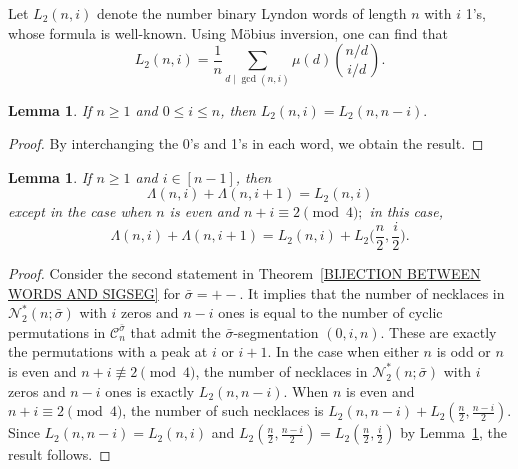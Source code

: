 \documentclass[12pt]{article}
\newcommand{\C}{\mathcal{C}}
\newcommand{\N}{\mathcal{N}}
\theoremstyle{plain}
\newtheorem{lemma}[theorem]{Lemma}
\theoremstyle{definition}
\begin{document}
Let $L_2(n,i)$ denote the number binary Lyndon words of length $n$ with $i$ 1's,  whose formula is well-known. Using M\"obius inversion, one can find that $$L_2(n,i) = \frac{1}{n} \sum_{d\mid\gcd(n,i)} \mu(d) {{n/d}\choose{i/d}}.$$

 
 
\begin{lemma}\label{WORD SYMMETRY}
If $n\geq 1$ and $0\leq i \leq n$, then $L_2(n,i)=L_2(n,n-i).$
\end{lemma}

\begin{proof}
By interchanging the 0's and 1's in each word, we obtain the result.
\end{proof}


\begin{lemma}\label{SUM PEAKS}
If $n\geq 1$ and $i \in [n-1]$, then
	\[\Lambda(n,i)+\Lambda(n,i+1)= L_2(n,i) \]
except in the case when $n$ is even and $n+i \equiv 2 \!\pmod 4;$ in this case,
	  \[\Lambda(n,i)+\Lambda(n,i+1)= L_2(n,i)+L_2\Big(\frac n2,\frac i2\Big). \]
\end{lemma}
	

\begin{proof}
Consider the second statement in Theorem~\ref{BIJECTION BETWEEN WORDS AND SIGSEG} for $\bar\sigma = +-$. It implies that the number of necklaces in $\N^*_2(n;\bar\sigma)$ with $i$ zeros and $n-i$ ones is equal to the number of cyclic permutations in $\C_n^{\bar\sigma}$ that admit the $\bar\sigma$-segmentation $(0,i,n)$. These are exactly the permutations with a peak at $i$ or $i+1$. In the case when either $n$ is odd or $n$ is even and $n+i \not\equiv 2\!\pmod 4$, the number of necklaces in $\N^*_2(n;\bar\sigma)$ with $i$ zeros and $n-i$ ones is exactly $L_2(n,n-i)$. When $n$ is even and $n+i\equiv 2 \!\pmod 4$, the number of such necklaces is $L_2(n,n-i) + L_2(\frac{n}{2}, \frac{n-i}{2})$. Since $L_2(n,n-i) = L_2(n,i)$ and $L_2(\frac{n}{2}, \frac{n-i}{2}) = L_2(\frac{n}{2}, \frac{i}{2})$ by Lemma~\ref{WORD SYMMETRY}, the result follows.
\end{proof}
\end{document}
